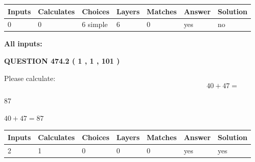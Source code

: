 \documentclass[12pt]{article}
\begin{document}
   
   
   
\noindent\begin{tabular}{|l|l|l|l|l|l|l|}
 \hline
Inputs & Calculates & Choices & Layers & Matches & Answer & Solution \\ \hline
 0  & 
 0  & 
 6
  simple  
  & 
 6  & 
 0  & 
  yes & 
  no 
  \\ \hline
 \end{tabular}
   
   
   
   
\noindent{}
   
   
   
   
\noindent\vspace{0.1in}\hspace{-0.08in} {\textbf{\Large{All inputs: }}}
   
   
  
\vspace{0.2in}
  
{\textbf{\Large{QUESTION
474.2 
 ( 1 , 1 , 101 )
}}}
  
  
 
Please calculate:
\begin{equation}
40 +  %
47 = \nonumber
\end{equation}
 
 
 
\noindent{}
 
 

87
 
 
\noindent{}
 
 

 
 
 
\noindent{}
 
 

$ %
40 +  %
47=   %
87$
 
 
\noindent{}
 
 

 
   
   
   
   
\noindent\begin{tabular}{|l|l|l|l|l|l|l|}
 \hline
Inputs & Calculates & Choices & Layers & Matches & Answer & Solution \\ \hline
 2  & 
 1  & 
 0
  & 
 0  & 
 0  & 
  yes & 
  yes 
  \\ \hline
 \end{tabular}
   
\end{document}
